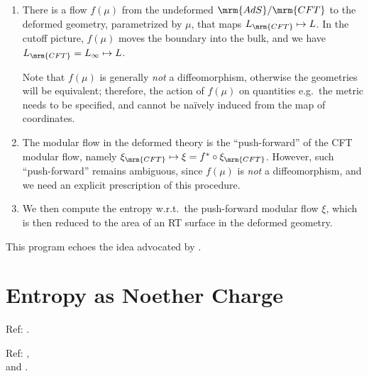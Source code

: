 \documentclass[a4paper
	,10pt
]{article}
\begin{document}
	\begin{enumerate}
	\item There is a flow $f(\mu)$ from the undeformed $\mrm{AdS}/\mrm{CFT}$ to the deformed geometry, parametrized by $\mu$, that maps $L_\mrm{CFT}\mapsto L$. 
	In the cutoff picture, $f(\mu)$ moves the boundary into the bulk, and we have $L_\mrm{CFT} = L_\infty\mapsto L$. 
	
	Note that $f(\mu)$ is generally \textit{not} a diffeomorphism, otherwise the geometries will be equivalent; therefore, the action of $f(\mu)$ on quantities e.g.~the metric needs to be specified, and cannot be na\"ively induced from the map of coordinates. 
	
	\item The modular flow in the deformed theory is the ``push-forward'' of the CFT modular flow, namely $\xi_\mrm{CFT} \mapsto \xi = f^* \circ \xi_\mrm{CFT}$. However, such ``push-forward'' remains ambiguous, since $f(\mu)$ is \textit{not} a diffeomorphism, and we need an explicit prescription of this procedure.
	
	\item We then compute the entropy w.r.t.~the push-forward modular flow $\xi$, which is then reduced to the area of an RT surface in the deformed geometry. 
	
	\end{enumerate}
	This program echoes the idea advocated by \textcite{Guica:2019nzm}. 
\section{Entropy as Noether Charge}
	
	Ref: \textcite{Wald:1993nt,Iyer:1994ys,Iyer:1995kg}.
	
	Ref: \textcite{Lewkowycz:2013nqa}, \\
	\hspace*{4em} and \textcite{Faulkner:2013ana}.
	
\end{document}

